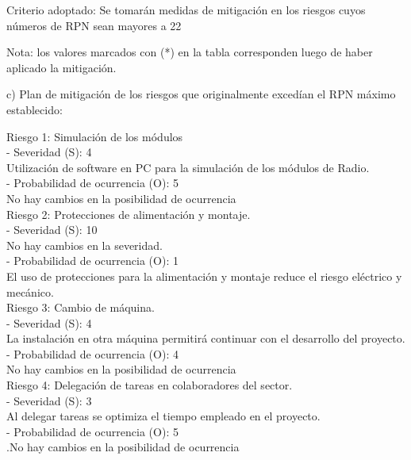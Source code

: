 \documentclass[
11pt%
]{charter}
\begin{document}
Criterio adoptado: 
Se tomarán medidas de mitigación en los riesgos cuyos números de RPN sean mayores a 22

Nota: los valores marcados con (*) en la tabla corresponden luego de haber aplicado la mitigación.

c) Plan de mitigación de los riesgos que originalmente excedían el RPN máximo establecido:
 
Riesgo 1: Simulación de los módulos\\
    \hfill \break
  - Severidad (S): 4\\
    \hspace{0.25cm}Utilización de software en PC para la simulación de los módulos de Radio.\\
	\hfill \break
  - Probabilidad de ocurrencia (O): 5\\
  	\hspace{0.25cm}No hay cambios en la posibilidad de ocurrencia\\
        \hfill \break
Riesgo 2: Protecciones de alimentación y montaje.\\
    \hfill \break
  - Severidad (S): 10\\
    \hspace{0.25cm}No hay cambios en la severidad.\\
	\hfill \break
  - Probabilidad de ocurrencia (O): 1\\
  	\hspace{0.25cm}El uso de protecciones para la alimentación y montaje reduce el riesgo eléctrico y mecánico.\\ 
    \hfill \break  	
Riesgo 3: Cambio de máquina.\\
    \hfill \break
  - Severidad (S): 4\\
    \hspace{0.25cm}La instalación en otra máquina permitirá continuar con el desarrollo del proyecto.\\ 
    \hfill \break
  - Probabilidad de ocurrencia (O): 4\\
  	\hspace{0.25cm}No hay cambios en la posibilidad de ocurrencia\\ 
    \hfill \break  	
Riesgo 4: Delegación de tareas en colaboradores del sector.\\
    \hfill \break
  - Severidad (S): 3\\
    \hspace{0.25cm}Al delegar tareas se optimiza el tiempo empleado en el proyecto.\\ 
    \hfill \break
  - Probabilidad de ocurrencia (O): 5\\
  	\hspace{0.25cm}.No hay cambios en la posibilidad de ocurrencia\\ 
\end{document}
